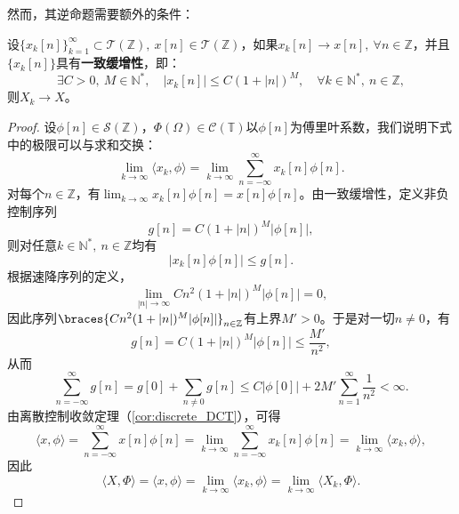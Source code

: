 然而，其逆命题需要额外的条件：
\begin{theorem}\label{thm:DTFT_continuous_2}
    设$\{x_k[n]\}_{k=1}^\infty\subset\mathcal{T}(\mathbb{Z}),\ x[n]\in\mathcal{T}(\mathbb{Z})$，如果$x_k[n]\to x[n],\ \forall n\in\mathbb{Z}$，并且$\{x_k[n]\}$具有\textbf{一致缓增性}，即：
    \begin{equation}
        \exists C>0,\ M\in\mathbb{N}^*,\quad |x_k[n]|\leq C(1+|n|)^M,\quad \forall k\in\mathbb{N}^*,\ n\in\mathbb{Z},
    \end{equation}
    则$X_k\to X$。
\end{theorem}
\begin{proof}
    设$\phi[n]\in\mathcal{S}(\mathbb{Z})$，$\Phi(\Omega)\in\mathcal{C}(\mathbb{T})$以$\phi[n]$为傅里叶系数，我们说明下式中的极限可以与求和交换：
    \begin{equation}
        \lim_{k\to\infty}\langle x_k,\phi\rangle=\lim_{k\to\infty}\sum_{n=-\infty}^{\infty}x_k[n]\phi[n].
    \end{equation}
    对每个$n\in\mathbb{Z}$，有$\lim_{k\to\infty}x_k[n]\phi[n]=x[n]\phi[n]$。由一致缓增性，定义非负控制序列
    \begin{equation}
        g[n]=C(1+|n|)^M|\phi[n]|,
    \end{equation}
    则对任意$k\in\mathbb{N}^*,\ n\in\mathbb{Z}$均有
    \begin{equation}
        |x_k[n]\phi[n]|\leq g[n].
    \end{equation}
    根据速降序列的定义，
    \begin{equation}
        \lim_{|n|\to\infty}Cn^2(1+|n|)^M|\phi[n]|=0,
    \end{equation}
    因此序列$\braces{Cn^2(1+|n|)^M|\phi[n]|}_{n\in\mathbb{Z}}$有上界$M'>0$。于是对一切$n\neq 0$，有
    \begin{equation}
        g[n]=C(1+|n|)^M|\phi[n]|\leq \frac{M'}{n^2},
    \end{equation}
    从而
    \begin{equation}
        \sum_{n=-\infty}^{\infty}g[n]=g[0]+\sum_{n\neq 0}g[n]\leq C|\phi[0]|+2M'\sum_{n=1}^{\infty}\frac{1}{n^2}<\infty.
    \end{equation}
    由离散控制收敛定理（\cref{cor:discrete_DCT}），可得
    \begin{equation}
        \langle x,\phi\rangle=\sum_{n=-\infty}^{\infty}x[n]\phi[n]=\lim_{k\to\infty}\sum_{n=-\infty}^{\infty}x_k[n]\phi[n]=\lim_{k\to\infty}\langle x_k,\phi\rangle,
    \end{equation}
    因此
    \begin{equation}
        \langle X,\Phi\rangle=\langle x,\phi\rangle=\lim_{k\to\infty}\langle x_k,\phi\rangle=\lim_{k\to\infty}\langle X_k,\Phi\rangle.
    \end{equation}
\end{proof}

